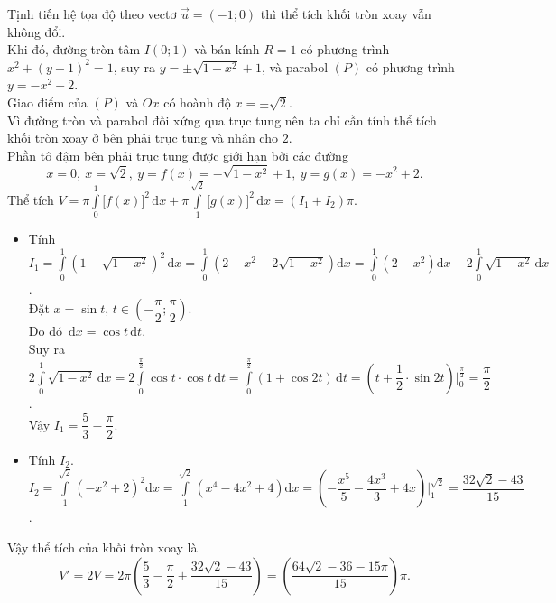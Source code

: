 \begin{ex}
{\begin{center}
		\end{center}
		Tịnh tiến hệ tọa độ theo vectơ $\overrightarrow{u}=(-1;0)$ thì thể tích khối tròn xoay vẫn không đổi.\\
		Khi đó, đường tròn tâm $I(0;1)$ và bán kính $R=1$ có phương trình $x^2+(y-1)^2=1$, suy ra $y=\pm \sqrt{1-x^2}+1$, và parabol $(P)$ có phương trình $y=-x^2+2$.\\
		Giao điểm của $(P)$ và $Ox$ có hoành độ $x=\pm \sqrt{2}$.\\
		Vì đường tròn và parabol đối xứng qua trục tung nên ta chỉ cần tính thể tích khối tròn xoay ở bên phải trục tung và nhân cho $2$.\\
		Phần tô đậm bên phải trục tung được giới hạn bởi các đường 
		\[x=0,\ x=\sqrt{2},\ y=f(x)=-\sqrt{1-x^2}+1,\ y=g(x)=-x^2+2.\]
		Thể tích $V=\pi \displaystyle\int\limits_0^1 \big[f(x)\big]^2\mathrm{\,d}x+\pi\displaystyle\int\limits_1^{\sqrt{2}} \big[g(x)\big]^2\mathrm{\,d}x=(I_1+I_2)\pi$.
		\begin{itemize}
			\item Tính $I_1
			=\displaystyle\int\limits_0^1 \left(1-\sqrt{1-x^2}\right)^2 \mathrm{\,d}x
			=\displaystyle\int\limits_0^1 \left(2-x^2-2\sqrt{1-x^2}\right)\mathrm{d}x
			=\displaystyle\int\limits_0^1\left(2-x^2\right)\mathrm{d}x-2\displaystyle\int\limits_0^1 \sqrt{1-x^2}\mathrm{\,d}x$.\\
			Đặt $x=\sin t$, $t\in \left(-\dfrac{\pi}{2};\dfrac{\pi}{2}\right)$.\\
			Do đó $\mathrm{\,d}x=\cos t\mathrm{\,d}t$.\\
			Suy ra $2\displaystyle\int\limits_0^1 \sqrt{1-x^2}\mathrm{\,d}x
			=2\displaystyle\int\limits_0^{\tfrac{\pi}{2}} \cos t \cdot \cos t\mathrm{\,d}t
			=\displaystyle\int\limits_0^{\tfrac{\pi}{2}} (1+\cos 2t) \mathrm{\,d}t
			=\left(t+\dfrac{1}{2}\cdot \sin 2t\right)\bigg|_0^{\tfrac{\pi}{2}}=\dfrac{\pi}{2}$.\\
			Vậy $I_1=\dfrac{5}{3}-\dfrac{\pi}{2}$.
			\item Tính $I_2$.\\
			$I_2=\displaystyle\int\limits_1^{\sqrt{2}}\left(-x^2+2\right)^2\mathrm{d}x=\displaystyle\int\limits_1^{\sqrt{2}} \left(x^4-4x^2+4\right)\mathrm{d}x=\left(-\dfrac{x^5}{5}-\dfrac{4x^3}{3}+4x\right)\bigg|_1^{\sqrt{2}}=\dfrac{32\sqrt{2}-43}{15}$.
		\end{itemize}
		Vậy thể tích của khối tròn xoay là \[V'=2V
		=2\pi\left(\dfrac{5}{3}-\dfrac{\pi}{2}+\dfrac{32\sqrt{2}-43}{15}\right)
		=\left(\dfrac{64\sqrt{2}-36-15\pi}{15}\right)\pi.\]
	}
\end{ex}

